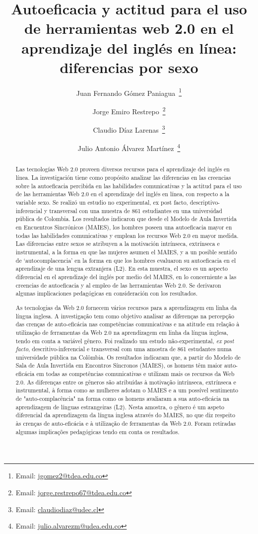 \documentclass[spanish]{textolivre}
\title{Autoeficacia y actitud para el uso de herramientas web 2.0 en el aprendizaje del inglés en línea: diferencias por sexo}
\author[1]{Juan Fernando Gómez Paniagua~\orcid{0000-0003-1004-6793}\thanks{Email: \href{mailto:jgomez2@tdea.edu.co}{jgomez2@tdea.edu.co}}}
\author[1]{Jorge Emiro Restrepo~\orcid{0000-0001-8790-7454}\thanks{Email: \href{mailto:jorge.restrepo67@tdea.edu.co}{jorge.restrepo67@tdea.edu.co}}}
\author[2]{Claudio Díaz Larenas~\orcid{0000-0003-2394-2378}\thanks{Email: \href{mailto:claudiodiaz@udec.cl}{claudiodiaz@udec.cl}}}
\author[3]{Julio Antonio Álvarez Martínez~\orcid{0000-0001-9481-7422}\thanks{Email: \href{mailto:julio.alvarezm@udea.edu.co}{julio.alvarezm@udea.edu.co}}}
\affil[1]{Tecnológico de Antioquia, Institución Universitaria, Departamento de Ciencias Básicas y Áreas Comunes, Medellín, Colombia.}
\affil[2]{Universidad de Concepción, Facultad de Educación, Departamento de Curriculum e Instrucción, Bío Bío, Chile.}
\affil[3]{Universidad de Antioquia, Escuela de Idiomas, Medellín, Colombia.}
\begin{document}
\maketitle
\begin{polyabstract}
\begin{abstract}
Las tecnologías Web 2.0 proveen diversos recursos para el aprendizaje del inglés en línea. La investigación tiene como propósito analizar las diferencias en las creencias sobre la autoeficacia percibida en las habilidades comunicativas y la actitud para el uso de las herramientas Web 2.0 en el aprendizaje del inglés en línea, con respecto a la variable sexo. Se realizó un estudio no experimental, ex post facto, descriptivo-inferencial y transversal con una muestra de 861 estudiantes en una universidad pública de Colombia. Los resultados indicaron que desde el Modelo de Aula Invertida en Encuentros Sincrónicos (MAIES), los hombres poseen una autoeficacia mayor en todas las habilidades comunicativas y emplean los recursos Web 2.0 en mayor medida. Las diferencias entre sexos se atribuyen a la motivación intrínseca, extrínseca e instrumental, a la forma en que las mujeres asumen el MAIES, y a un posible sentido de ‘autocomplacencia’ en la forma en que los hombres evaluaron su autoeficacia en el aprendizaje de una lengua extranjera (L2). En esta muestra, el sexo es un aspecto diferencial en el aprendizaje del inglés por medio del MAIES, en lo concerniente a las creencias de autoeficacia y al empleo de las herramientas Web 2.0. Se derivaron algunas implicaciones pedagógicas en consideración con los resultados.

\end{abstract}

\begin{abstract}
As tecnologias da Web 2.0 fornecem vários recursos para a aprendizagem em linha da língua inglesa. A investigação tem como objetivo analisar as diferenças na percepção das crenças de auto-eficácia nas competências comunicativas e na atitude em relação à utilização de ferramentas da Web 2.0 na aprendizagem em linha da língua inglesa, tendo em conta a variável gênero. Foi realizado um estudo não-experimental, \textit{ex post facto}, descritivo-inferencial e transversal com uma amostra de 861 estudantes numa universidade pública na Colômbia. Os resultados indicaram que, a partir do Modelo de Sala de Aula Invertida em Encontros Síncronos (MAIES), os homens têm maior auto-eficácia em todas as competências comunicativas e utilizam mais os recursos da Web 2.0. As diferenças entre os gêneros são atribuídas à motivação intrínseca, extrínseca e instrumental, à forma como as mulheres adotam o MAIES e a um possível sentimento de "auto-complacência" na forma como os homens avaliaram a sua auto-eficácia na aprendizagem de línguas estrangeiras (L2). Nesta amostra, o gênero é um aspeto diferencial da aprendizagem da língua inglesa através do MAIES, no que diz respeito às crenças de auto-eficácia e à utilização de ferramentas da Web 2.0. Foram retiradas algumas implicações pedagógicas tendo em conta os resultados.


\end{abstract}
\end{polyabstract}
\end{document}
